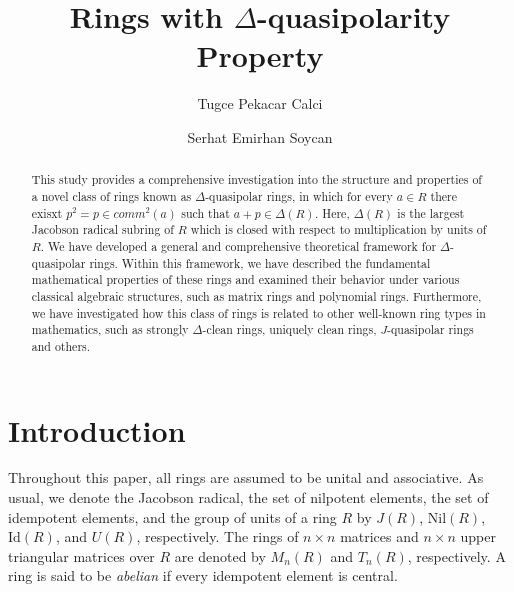 \documentclass[12pt, reqno]{amsart}
\numberwithin{equation}{section}
\begin{document}
\title{Rings with $\Delta$-quasipolarity Property}

\author{Tugce Pekacar Calci}
\author{Serhat Emirhan Soycan}
\address{
Department of Mathematics, Ankara University, Ankara, Turkey}
\address{
Ankara University Graduate School of National and Applied Sciences, Ankara, Turkey}

 





\begin{abstract}
This study provides a comprehensive investigation into the structure and properties of a novel class of rings known as $\Delta$-quasipolar rings, in which for every $a\in R$ there exisxt $p^2=p \in comm^2(a)$ such that $a+p \in \Delta(R)$. Here, $\Delta(R)$ is the largest Jacobson radical subring of $R$ which is closed with respect
to multiplication by units of $R$.
We have developed a general and comprehensive theoretical framework for $\Delta$-quasipolar rings. Within this framework, we have described the fundamental mathematical properties of these rings and examined their behavior under various classical algebraic structures, such as matrix rings and polynomial rings. Furthermore, we have investigated how this class of rings is related to other well-known ring types in mathematics, such as strongly $\Delta$-clean rings, uniquely clean rings, $J$-quasipolar rings and others.

 \vspace{2mm}



\end{abstract}



\maketitle

\section{Introduction}
Throughout this paper, all rings are assumed to be unital and associative. As usual, we denote the Jacobson radical, the set of nilpotent elements, the set of idempotent elements, and the group of units of a ring $R$ by $J(R)$, $\text{Nil}(R)$, $\text{Id}(R)$, and $U(R)$, respectively. The rings of $n \times n$ matrices and $n \times n$ upper triangular matrices over $R$ are denoted by $M_n(R)$ and $T_n(R)$, respectively. A ring is said to be \textit{abelian} if every idempotent element is central.
\end{document}
